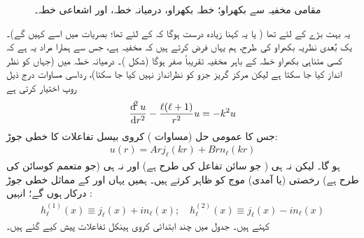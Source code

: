 \begin{figure}
\centering
{}
\caption{مقامی مخفیہ سے بکھراو؛ خطہ بکھراو، درمیانہ خطہ، اور اشعاعی خطہ۔}
\label{شکل_بکھراو_تین_خطے}
\end{figure}


یہ بہت بڑے  کے لئے تھا ( یا یہ کہنا زیادہ درست ہوگا کہ  کے لئے تھا؛ بصریات میں اسے  کہیں گے)۔ یک بُعدی نظریہ بکھراو کی طرح، ہم یہاں فرض کرتے ہیں کہ مخفیہ  ہے، جس سے ہمارا مراد یہ ہے کہ کسی متناہی بکھراو خطہ کے باہر مخفیہ تقریباً صفر ہوگا (شکل )۔ درمیانہ خطہ میں (جہاں  کو نظر انداز کیا جا سکتا ہے لیکن مرکز گریز جزو کو نظرانداز نہیں کیا جا سکتا)، رداسی مساوات درج ذیل روپ اختیار کرتی ہے
\begin{align}
	\frac{\dif^2u}{\dif r^2}-\frac{\ell(\ell+1)}{r^2}u = -k^2u
\end{align}
جس کا عمومی حل (مساوات ) کروی بیسل تفاعلات کا خطی جوڑ:
\begin{align}
	u(r) = Arj_{\ell}(kr)+Brn_{\ell}(kr)
\end{align}
ہو گا۔ لیکن نہ ہی  ( جو سائن تفاعل کی طرح ہے) اور نہ ہی  (جو متعمم کوسائن کی طرح ہے) رخصتی (یا آمدی) موج کو ظاہر کرتے ہیں۔ ہمیں یہاں  اور  کے مماثل خطی جوڑ درکار ہوں گے؛ انہیں :
\begin{align}\label{مساوات_بکھراو_کروی_ہینکل}
	h^{(1)}_{\ell}(x)\equiv j_{\ell}(x)+in_{\ell}(x);\quad h^{(2)}_{\ell}(x)\equiv j_{\ell}(x)-in_{\ell}(x)
\end{align}
 کہتے ہیں۔ جدول  میں چند ابتدائی کروی ہینکل تفاعلات پیش کیے گئے ہیں۔
